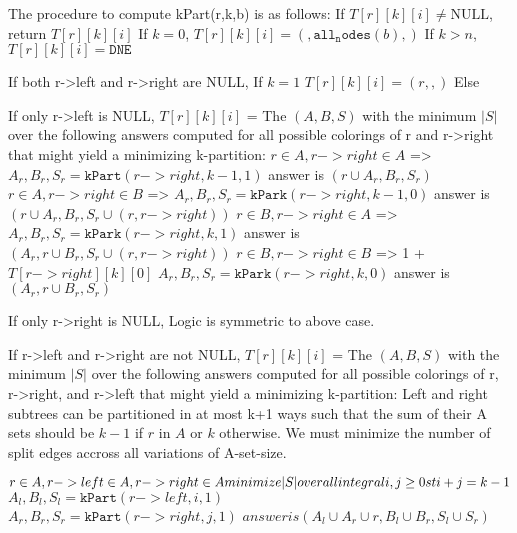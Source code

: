 \documentclass[11pt]{article}
\begin{document}
The procedure to compute kPart(r,k,b) is as follows:
    If $T[r][k][i] \neq \text{NULL}$,
       return $T[r][k][i]$
    If $k = 0$,
       $T[r][k][i] = ({}, {\mathtt{all_nodes}(b)}, {})$
    If $k > n$,
       $T[r][k][i] = \mathtt{DNE}$

    If both r->left and r->right are NULL,
        If $k=1$
            $T[r][k][i] = ({r}, {}, {})$
        Else

    If only r->left is NULL,
        $T[r][k][i]$ = The $(A,B,S)$ with the minimum $|S|$ over the following answers computed for all possible colorings of r and r->right that might yield a minimizing k-partition:
          $r \in A, r->right \in A$ =>
            $A_r, B_r, S_r = \mathtt{kPart}(r->right,k-1,1)$
            answer is $({r} \cup A_r, B_r, S_r)$
          $r \in A, r->right \in B$ =>
            $A_r, B_r, S_r = \mathtt{kPark}(r->right,k-1,0)$
            answer is $({r} \cup A_r, B_r, S_r \cup {(r, r->right)})$
          $r \in B, r->right \in A$ =>
            $A_r, B_r, S_r = \mathtt{kPark}(r->right,k,1)$
            answer is $(A_r,{r} \cup B_r, S_r \cup {(r, r->right)})$
          $r \in B, r->right \in B$ => 1 + $T[r->right][k][0]$
            $A_r, B_r, S_r = \mathtt{kPark}(r->right,k,0)$
            answer is $(A_r,{r} \cup B_r, S_r)$

    If only r->right is NULL,
        Logic is symmetric to above case.

    If r->left and r->right are not NULL,
        $T[r][k][i]$ = The $(A,B,S)$ with the minimum $|S|$ over the following answers computed for all possible colorings of r, r->right, and r->left that might yield a minimizing k-partition:
                Left and right subtrees can be partitioned in at most k+1 ways such that the sum of their A sets should be $k-1$ if $r$ in $A$ or $k$ otherwise.
                We must minimize the number of split edges accross all variations of A-set-size.

          $r \in A, r->left \in A, r->right \in A\\
              minimize |S| over all integral i,j \geq 0 st i+j = k-1$\\
                $A_l, B_l, S_l = \mathtt{kPart}(r->left,i,1)$\\
                $A_r, B_r, S_r = \mathtt{kPart}(r->right,j,1)$
                $answer is (A_l \cup A_r \cup {r},B_l \cup B_r,S_l \cup S_r)$
\end{document}
